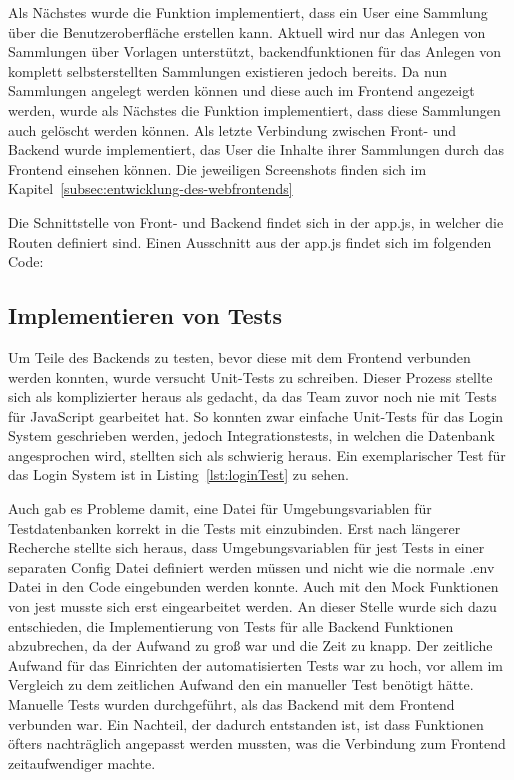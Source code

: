 Als Nächstes wurde die Funktion implementiert, dass ein User eine Sammlung über die Benutzeroberfläche erstellen kann.
Aktuell wird nur das Anlegen von Sammlungen über Vorlagen unterstützt, backendfunktionen für das Anlegen von komplett selbsterstellten Sammlungen existieren jedoch bereits.
Da nun Sammlungen angelegt werden können und diese auch im Frontend angezeigt werden, wurde als Nächstes die Funktion implementiert, dass diese Sammlungen auch gelöscht werden können.
Als letzte Verbindung zwischen Front- und Backend wurde implementiert, das User die Inhalte ihrer Sammlungen durch das Frontend einsehen können.
Die jeweiligen Screenshots finden sich im Kapitel~\ref{subsec:entwicklung-des-webfrontends}

Die Schnittstelle von Front- und Backend findet sich in der app.js, in welcher die Routen definiert sind.
Einen Ausschnitt aus der app.js findet sich im folgenden Code:

\vspace{1em}

\vspace{1em}
\newpage

\subsection{Implementieren von Tests}\label{subsec:implementieren-von-tests}

Um Teile des Backends zu testen, bevor diese mit dem Frontend verbunden werden konnten, wurde versucht Unit-Tests zu schreiben.
Dieser Prozess stellte sich als komplizierter heraus als gedacht, da das Team zuvor noch nie mit Tests für JavaScript gearbeitet hat.
So konnten zwar einfache Unit-Tests für das Login System geschrieben werden, jedoch Integrationstests, in welchen die Datenbank angesprochen wird, stellten sich als schwierig heraus.
Ein exemplarischer Test für das Login System ist in Listing~\ref{lst:loginTest} zu sehen.

\vspace{1em}

\vspace{1em}

Auch gab es Probleme damit, eine Datei für Umgebungsvariablen für Testdatenbanken korrekt in die Tests mit einzubinden.
Erst nach längerer Recherche stellte sich heraus, dass Umgebungsvariablen für jest Tests in einer separaten Config Datei definiert werden müssen und nicht wie die normale .env Datei in den Code eingebunden werden konnte.
Auch mit den Mock Funktionen von jest musste sich erst eingearbeitet werden.
An dieser Stelle wurde sich dazu entschieden, die Implementierung von Tests für alle Backend Funktionen abzubrechen, da der Aufwand zu groß war und die Zeit zu knapp.
Der zeitliche Aufwand für das Einrichten der automatisierten Tests war zu hoch, vor allem im Vergleich zu dem zeitlichen Aufwand den ein manueller Test benötigt hätte.
Manuelle Tests wurden durchgeführt, als das Backend mit dem Frontend verbunden war.
Ein Nachteil, der dadurch entstanden ist, ist dass Funktionen öfters nachträglich angepasst werden mussten, was die Verbindung zum Frontend zeitaufwendiger machte.
